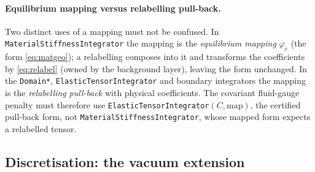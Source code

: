 \documentclass[11pt]{article}
\numberwithin{equation}{section}
\theoremstyle{remark}
\newcommand{\code}[1]{\texttt{#1}}
\begin{document}
\paragraph{Equilibrium mapping versus relabelling pull-back.} Two distinct
uses of a mapping must not be confused. In \code{MaterialStiffnessIntegrator}
the mapping is the \emph{equilibrium mapping} $\varphi_e$ (the form
\eqref{eq:matgeo}); a relabelling composes into it and transforms the
coefficients by \eqref{eq:relabel} (owned by the background layer), leaving
the form unchanged. In the \code{Domain*}, \code{ElasticTensorIntegrator}
and boundary integrators the mapping is the \emph{relabelling pull-back}
with physical coefficients. The covariant fluid-gauge penalty must
therefore use \code{ElasticTensorIntegrator}$(C,\text{map})$, the certified
pull-back form, not \code{MaterialStiffnessIntegrator}, whose mapped form
expects a relabelled tensor.

\subsection{Discretisation: the vacuum extension}
\label{sec:vacuum}
\end{document}
